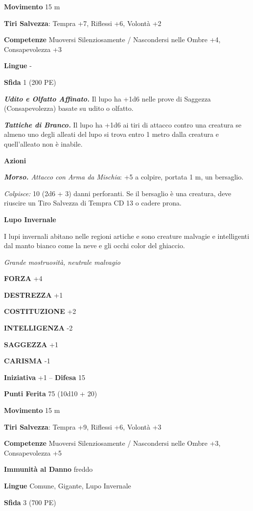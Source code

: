 \begin{multicols}{2}
\textbf{Movimento} 15 m

\textbf{Tiri Salvezza}: Tempra +7, Riflessi +6, Volontà +2 

\textbf{Competenze} Muoversi Silenziosamente / Nascondersi nelle Ombre +4, Consapevolezza +3

\textbf{Lingue} -

\textbf{Sfida} 1 (200 PE)

\emph{\textbf{Udito e Olfatto Affinato.}} Il lupo ha +1d6 nelle prove di Saggezza (Consapevolezza) basate su udito o olfatto.

\emph{\textbf{Tattiche di Branco.}} Il lupo ha +1d6 ai tiri di attacco contro una creatura se almeno uno degli alleati del lupo si trova entro 1 metro dalla creatura e quell'alleato non è inabile.

\textbf{Azioni}

\emph{\textbf{Morso.} Attacco con Arma da Mischia}: +5 a colpire, portata 1 m, un bersaglio.

\emph{Colpisce:} 10 (2d6 + 3) danni perforanti. Se il bersaglio è una creatura, deve riuscire un Tiro Salvezza di Tempra CD 13 o cadere prona.

\medskip\textbf{Lupo Invernale}

I lupi invernali abitano nelle regioni artiche e sono creature malvagie e intelligenti dal manto bianco come la neve e gli occhi color del ghiaccio.

\emph{Grande mostruosità, neutrale malvagio}

\textbf{FORZA} +4

\textbf{DESTREZZA} +1

\textbf{COSTITUZIONE} +2

\textbf{INTELLIGENZA} -2

\textbf{SAGGEZZA} +1

\textbf{CARISMA} -1

\textbf{Iniziativa} +1 -- \textbf{Difesa} 15

\textbf{Punti Ferita} 75 (10d10 + 20)

\textbf{Movimento} 15 m

\textbf{Tiri Salvezza}: Tempra +9, Riflessi +6, Volontà +3 

\textbf{Competenze} Muoversi Silenziosamente / Nascondersi nelle Ombre +3, Consapevolezza +5

\textbf{Immunità al Danno} freddo

\textbf{Lingue} Comune, Gigante, Lupo Invernale

\textbf{Sfida} 3 (700 PE)


\end{multicols}
